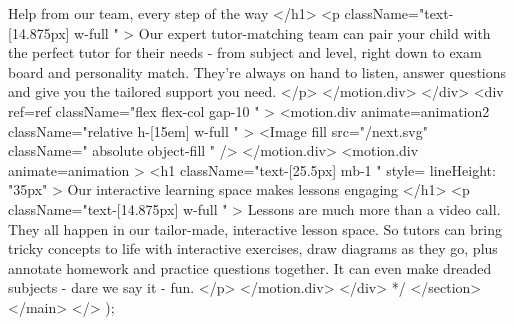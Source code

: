 {{                Help from our team, every step of the way
              </h1>
              <p className="text-[14.875px] w-full  " >
                Our expert tutor-matching team can pair your child with the perfect tutor for their needs - from subject and level, right down to exam board and personality match. They’re always on hand to listen, answer questions and give you the tailored support you need.
              </p>
            </motion.div>
          </div>
          <div ref={ref} className="flex flex-col gap-10 " >
            <motion.div animate={animation2}   className="relative h-[15em] w-full  " >
              <Image
                fill
                src={"/next.svg"}
                className="  absolute  object-fill "
              />
            </motion.div>
            <motion.div animate={animation}  >
              <h1 className="text-[25.5px] mb-1 " style={{ lineHeight: "35px" }} >
                Our interactive learning space makes lessons engaging
              </h1>
              <p className="text-[14.875px] w-full  " >
                Lessons are much more than a video call. They all happen in our tailor-made, interactive lesson space. So tutors can bring tricky concepts to life with interactive exercises, draw diagrams as they go, plus annotate homework and practice questions together. It can even make dreaded subjects - dare we say it - fun.
              </p>
            </motion.div>
          </div> */}
        </section>
      </main>
    </>
  );
}
















